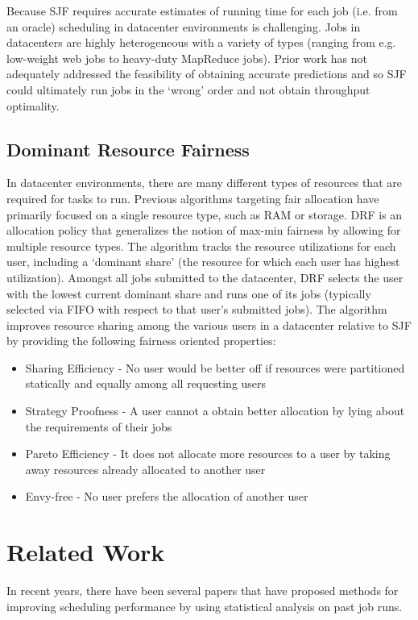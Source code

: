 \documentclass{hotnets19}
\begin{document}
Because SJF requires accurate estimates of running time for each job (i.e. from an oracle) scheduling in datacenter environments is challenging. Jobs in datacenters are highly heterogeneous with a variety of types (ranging from e.g. low-weight web jobs to heavy-duty MapReduce jobs). Prior work has not adequately addressed the feasibility of obtaining accurate predictions and so SJF could ultimately run jobs in the `wrong' order and not obtain throughput optimality.

\subsection{Dominant Resource Fairness}
In datacenter environments, there are many different types of resources that are required for tasks to run. Previous algorithms targeting fair allocation have primarily focused on a single resource type, such as RAM or storage. DRF \cite{ghodsi2011dominant} is an allocation policy that generalizes the notion of max-min fairness by allowing for multiple resource types. The algorithm tracks the resource utilizations for each user, including a `dominant share' (the resource for which each user has highest utilization). Amongst all jobs submitted to the datacenter, DRF selects the user with the lowest current dominant share and runs one of its jobs (typically selected via FIFO with respect to that user's submitted jobs). The algorithm improves resource sharing among the various users in a datacenter relative to SJF by providing the following fairness oriented properties:
\begin{itemize}
    \item Sharing Efficiency - No user would be better off if resources were partitioned statically and equally among all requesting users
    \item Strategy Proofness - A user cannot a obtain better allocation by lying about the requirements of their jobs
    \item Pareto Efficiency - It does not allocate more resources to a user by taking away resources already allocated to another user
    \item Envy-free - No user prefers the allocation of another user
\end{itemize}

\section{Related Work}
In recent years, there have been several papers that have proposed methods for improving scheduling performance by using statistical analysis on past job runs.
\end{document}
